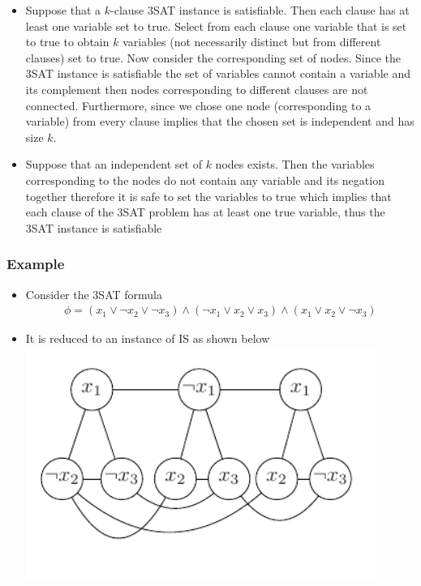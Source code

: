 \documentclass{beamer}
\begin{document}
\begin{frame}
  \begin{itemize}
  \item Suppose that a $k$-clause 3SAT instance is satisfiable. Then each clause has at least one variable set to true. Select from each clause
one variable that is set to true to obtain $k$ variables (not necessarily distinct but from different clauses) set to true.
 Now consider the corresponding  set of nodes. Since the 3SAT instance is satisfiable 
the set of variables cannot contain a variable and its complement then  nodes  corresponding to different clauses are not connected. Furthermore, since we chose 
one node (corresponding to a variable) from every clause implies that the chosen set is independent and has size $k$.

\item Suppose that an independent set of $k$ nodes exists. Then the variables corresponding to the nodes do not contain any variable and its negation together therefore it is safe to set the variables to true which implies that each clause of the 3SAT problem has at least one true variable, thus the 3SAT instance is satisfiable
  \end{itemize}
\end{frame}
\begin{frame}
  \frametitle{Example}
  \begin{itemize}
  \item Consider the 3SAT formula 
    \begin{align*}
      \phi=\left(x_1\lor\lnot x_2\lor\lnot x_3\right)\land\left(\lnot x_1\lor x_2\lor x_3\right)\land\left(x_1\lor x_2\lor\lnot x_3\right)
    \end{align*}
\item It is reduced to an instance of IS as shown below
\includegraphics[width=0.9\textwidth]{np-figs/example-3SAT-to-IS}
  \end{itemize}
\end{frame}
\end{document}
